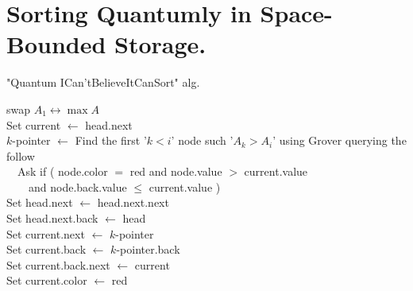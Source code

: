 \documentclass[manuscript,screen,review]{acmart}
\begin{document}
\section{Sorting Quantumly in Space-Bounded Storage.}

\begin{algorithm}
\SetAlgoLined
{}
\caption{ "Quantum ICan'tBelieveItCanSort"  alg.}\label{alg:alg3}
swap $A_{1} \leftrightarrow \max A$ \\
 {
    Set current $\leftarrow$ head.next \\

    $k$-pointer $\leftarrow$ Find the first '$k< i$' node such '$A_{k} > A_{i}$' using Grover querying the follow \\
    \ \ Ask if ( node.color $=$ red and node.value $ > $ current.value \\ 
    \ \ \ \ and node.back.value $\le$ current.value ) \\ 

    Set head.next $\leftarrow$ head.next.next \\
    Set head.next.back $\leftarrow$ head\\
    Set current.next $\leftarrow$ $k$-pointer \\
    Set current.back $\leftarrow$ $k$-pointer.back \\
    Set current.back.next $\leftarrow$ current \\ 
    Set current.color $\leftarrow$ red
}
\end{algorithm}
\printbibliography
\end{document}
